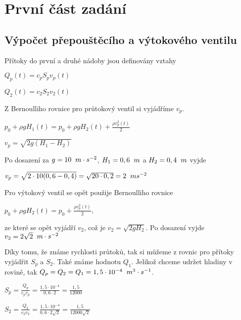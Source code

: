 \documentclass{article}
\begin{document}
	
	
	\newpage
	\tableofcontents %
	\newpage
		
		\newpage
	\section{První část zadání}
		\subsection{Výpočet přepouštěcího a výtokového ventilu}
			Přítoky do první a druhé nádoby jsou definovány vztahy 
			\begin{center}
			$Q_p (t)=c_pS_pv_p(t)$  
			
			\bigskip
			
			$Q_2(t)=c_2S_2v_2(t)$
			\end{center}
			
			Z Bernoulliho rovnice pro průtokový ventil si vyjádříme $v_p$.
			
			\begin{center}
			$p_0+\rho gH_1(t)=p_0+\rho gH_2(t)+\frac{\rho v^2_p(t)}{2}$
			
			$v_p=\sqrt{2g(H_1-H_2)}$ 
			
			\end{center}
			
			Po dosazení za $g=10 \hspace{2mm} m\cdot s^{-2}$, $H_1=0,6 \hspace{2mm} m$ a $H_2=0,4 \hspace{2mm} m$ vyjde 
			
			\begin{center} 
			$v_p=\sqrt{2\cdot10(0,6-0,4)}=\sqrt{20\cdot0,2}=2 \hspace{2mm} ms^{-2}$ 
			\end{center} 
			Pro výtokový ventil se opět použije Bernoulliho rovnice 
			\begin{center}
			$p_0+\rho gH_2(t)=p_0+\frac{\rho v^2_p(t)}{2}$,
			\end{center}
			 ze které se opět vyjádří $v_2$, což je $v_2=\sqrt{2gH_2}$. Po dosazení vyjde $v_2=2\sqrt{2} \hspace{2mm} m \cdot s^{-2}$
			
			Díky tomu, že známe rychlosti průtoků, tak si můžeme z rovnic pro přítoky vyjádřit $S_p$ a $S_2$. Také známe hodnotu $Q_1$. Jelikož chceme udržet hladiny v rovině, tak $Q_p=Q_2=Q_1=1,5 \cdot 10^{-4} \hspace{2mm} m^3 \cdot s^{-1}$.
			\begin{center}
			$S_p=\frac{Q_p}{c_pv_p}=\frac{1,5 \cdot 10^{-4}}{0,6 \cdot 2}=\frac{1,5}{12000}$
			
			\bigskip
			
			$S_2=\frac{Q_2}{c_2v_2}=\frac{1,5 \cdot 10^{-4}}{0,6 \cdot 2\sqrt{2}}=\frac{1,5}{12000\sqrt{2}}$
			
			\end{center}
						
\end{document}
